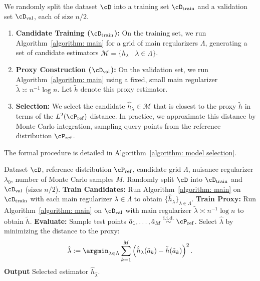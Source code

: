 \documentclass[english,11pt]{article}
\begin{document}
We randomly split the dataset $\cD$ into a training set $\cD_{\text{train}}$ and a validation set $\cD_{\text{val}}$, each of size $n/2$.
\begin{enumerate}
    \item \textbf{Candidate Training ($\cD_{\text{train}}$):} On the training set, we run Algorithm~\ref{algorithm: main} for a grid of main regularizers $\Lambda$, generating a set of candidate estimators $\mathcal{M} = \{ \hat{h}_\lambda \mid \lambda \in \Lambda \}$.
    \item \textbf{Proxy Construction ($\cD_{\text{val}}$):} On the validation set, we run Algorithm~\ref{algorithm: main} using a fixed, small main regularizer $\tilde{\lambda} \asymp n^{-1} \log n$. Let $\tilde{h}$ denote this proxy estimator.
    \item \textbf{Selection:} We select the candidate $\hat{h}_\lambda \in \mathcal{M}$ that is closest to the proxy $\tilde{h}$ in terms of the $L^2(\cP_{\operatorname{ref}})$ distance. In practice, we approximate this distance by Monte Carlo integration, sampling query points from the reference distribution $\cP_{\operatorname{ref}}$.
\end{enumerate}

The formal procedure is detailed in Algorithm~\ref{algorithm: model selection}.

\begin{algorithm}[h]
	\caption{Data-Driven Model Selection for TEF}
	\label{algorithm: model selection}
	\begin{algorithmic}[1]
		\REQUIRE Dataset $\cD$, reference distribution $\cP_{\operatorname{ref}}$, candidate grid $\Lambda$, nuisance regularizer $\lambda_0$, number of Monte Carlo samples $M$.
		\STATE Randomly split $\cD$ into $\cD_{\text{train}}$ and $\cD_{\text{val}}$ (sizes $n/2$).
		\STATE \textbf{Train Candidates:} Run Algorithm~\ref{algorithm: main} on $\cD_{\text{train}}$ with each main regularizer $\lambda \in \Lambda$ to obtain $\{\hat{h}_\lambda\}_{\lambda \in \Lambda}$.
        \STATE \textbf{Train Proxy:} Run Algorithm~\ref{algorithm: main} on $\cD_{\text{val}}$ with main regularizer $\tilde{\lambda} \asymp n^{-1} \log n$ to obtain $\tilde{h}$.
		\STATE \textbf{Evaluate:} Sample test points $\tilde{a}_1, \dots, \tilde{a}_M \overset{\text{i.i.d.}}{\sim} \cP_{\operatorname{ref}}$.
		\STATE Select $\hat{\lambda}$ by minimizing the distance to the proxy:
		\begin{align*}
			\hat{\lambda} := \argmin_{\lambda \in \Lambda} \sum_{k=1}^{M} \left( \hat{h}_\lambda(\tilde{a}_k) - \tilde{h}(\tilde{a}_k) \right)^2.
		\end{align*}
        \textbf{Output} Selected estimator $\hat{h}_{\hat{\lambda}}$.
	\end{algorithmic}
\end{algorithm}
\end{document}
